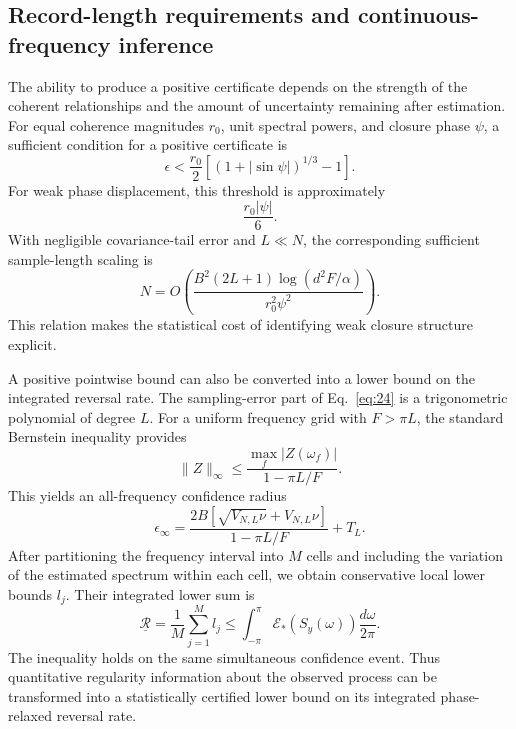 \documentclass[aps,pre,reprint,amsmath,amssymb,superscriptaddress]{revtex4-2}
\begin{document}
\subsection{Record-length requirements and continuous-frequency inference}

The ability to produce a positive certificate depends on the strength of the coherent relationships and the amount of uncertainty remaining after estimation.
For equal coherence magnitudes \(r_0\), unit spectral powers, and closure phase \(\psi\), a sufficient condition for a positive certificate is
\begin{equation}\label{eq:29}
\epsilon
<
\frac{r_0}{2}
\left[
(1+|\sin\psi|)^{1/3}-1
\right].
\end{equation}
For weak phase displacement, this threshold is approximately
\[
\frac{r_0|\psi|}{6}.
\]
With negligible covariance-tail error and \(L\ll N\), the corresponding sufficient sample-length scaling is
\begin{equation}\label{eq:30}
\boxed{
N=
O\left(
\frac{
B^2(2L+1)\log(d^2F/\alpha)
}{
r_0^2\psi^2
}
\right).
}
\end{equation}
This relation makes the statistical cost of identifying weak closure structure explicit.


A positive pointwise bound can also be converted into a lower bound on the integrated reversal rate.
The sampling-error part of Eq.~\eqref{eq:24} is a trigonometric polynomial of degree \(L\). For a uniform frequency grid with \(F>\pi L\), the standard Bernstein inequality provides
\[
\|Z\|_\infty
\le
\frac{
\max_f|Z(\omega_f)|
}{
1-\pi L/F
}.
\]
This yields an all-frequency confidence radius
\begin{equation}\label{eq:31}
\boxed{
\epsilon_\infty
=
\frac{
2B\left[
\sqrt{V_{N,L}\nu}
+
V_{N,L}\nu
\right]
}{
1-\pi L/F
}
+
T_L.
}
\end{equation}
After partitioning the frequency interval into \(M\) cells and including the variation of the estimated spectrum within each cell, we obtain conservative local lower bounds \(l_j\).
Their integrated lower sum is
\begin{equation}\label{eq:32}
\boxed{
\underline{\mathcal R}
=
\frac1M\sum_{j=1}^{M}l_j
\le
\int_{-\pi}^{\pi}
\mathcal E_*(S_y(\omega))
\frac{d\omega}{2\pi}.
}
\end{equation}
The inequality holds on the same simultaneous confidence event.
Thus quantitative regularity information about the observed process can be transformed into a statistically certified lower bound on its integrated phase-relaxed reversal rate.
\end{document}

